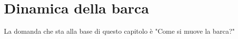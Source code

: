 \chapter{Dinamica della barca}
La domanda che sta alla base di questo capitolo è "Come si muove la barca?"